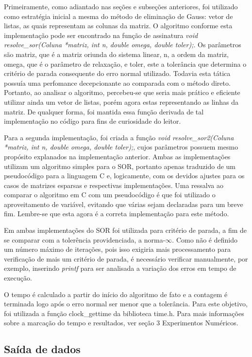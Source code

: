 \documentclass[
	article,			%
	11pt,				%
	oneside,			%
	a4paper,			%
	english,			%
	brazil,				%
	sumario=tradicional
	]{abntex2}
\begin{document}
Primeiramente, como adiantado nas seções e subseções anteriores,  foi utilizado como estratégia inicial a mesma do método de eliminação de Gauss: vetor de listas, as quais representam as colunas da matriz. O algoritmo conforme esta implementação pode ser encontrado na função de assinatura \emph{void resolve\_sor(Coluna *matriz, int n, double omega, double toler);}. Os parâmetros são matriz, que é a matriz oriunda do sistema linear, n, a ordem da matriz, omega, que é o parâmetro de relaxação, e toler, este a tolerância que determina o critério de parada consequente do erro normal utilizado. Todavia esta tática possuía uma perfomance decepcionante ao comparada com o método direto. Portanto, ao analisar o algoritmo, percebeu-se que seria mais prático e eficiente utilizar ainda um vetor de listas, porém agora estas representando as linhas da matriz. De qualquer forma, foi mantida essa função derivada de tal implementação no código para fins de curiosidade do leitor. 

Para a segunda implementação, foi criada a função \emph{void resolve\_sor2(Coluna *matriz, int n, double omega, double toler);}, cujos parâmetros possuem mesmo propósito explanados na implementação anterior. Ambas as implementações utilizam um algoritmo simples para o SOR, portanto apenas traduzido de um pseudocódigo para a linguagem C e, logicamente, com os devidos ajustes para os casos de matrizes esparsas e respectivas implementações. Uma ressalva ao comparar o algoritmo em C com um pseudocódigo é que foi utilizado o aproveitamento de variável, evitando que várias sejam declaradas para um breve fim. Lembre-se que esta agora é a correta implementação para este método.

Em ambas implementações do SOR foi utilizada para critério de parada, a fim de se comparar com a tolerência providenciada, a norma-$\infty$. Como não é definido um número máximo de iterações, pois isso exigiria mais processamento para verificação de mais um critério de parada, é necessário verificar manualmente, por exemplo, inserindo \emph{printf} para ser analisada a variação dos erros em tempo de execução.

O tempo é calculado a partir do início do algoritmo de fato e a contagem é terminada logo após o erro normal ser menor que a tolerância. Para este objetivo, foi utilizada a função clock\_gettime da biblioteca time.h. Para mais informações sobre a marcação do tempo e resultados, ver seção 3 Experimentos Numéricos.

\subsection{Saída de dados}
\end{document}
